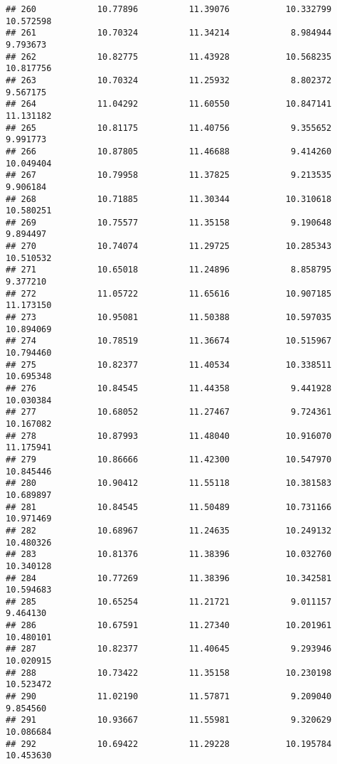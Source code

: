\documentclass[
]{article}
\begin{document}
\begin{verbatim}
## 260            10.77896          11.39076           10.332799         10.572598
## 261            10.70324          11.34214            8.984944          9.793673
## 262            10.82775          11.43928           10.568235         10.817756
## 263            10.70324          11.25932            8.802372          9.567175
## 264            11.04292          11.60550           10.847141         11.131182
## 265            10.81175          11.40756            9.355652          9.991773
## 266            10.87805          11.46688            9.414260         10.049404
## 267            10.79958          11.37825            9.213535          9.906184
## 268            10.71885          11.30344           10.310618         10.580251
## 269            10.75577          11.35158            9.190648          9.894497
## 270            10.74074          11.29725           10.285343         10.510532
## 271            10.65018          11.24896            8.858795          9.377210
## 272            11.05722          11.65616           10.907185         11.173150
## 273            10.95081          11.50388           10.597035         10.894069
## 274            10.78519          11.36674           10.515967         10.794460
## 275            10.82377          11.40534           10.338511         10.695348
## 276            10.84545          11.44358            9.441928         10.030384
## 277            10.68052          11.27467            9.724361         10.167082
## 278            10.87993          11.48040           10.916070         11.175941
## 279            10.86666          11.42300           10.547970         10.845446
## 280            10.90412          11.55118           10.381583         10.689897
## 281            10.84545          11.50489           10.731166         10.971469
## 282            10.68967          11.24635           10.249132         10.480326
## 283            10.81376          11.38396           10.032760         10.340128
## 284            10.77269          11.38396           10.342581         10.594683
## 285            10.65254          11.21721            9.011157          9.464130
## 286            10.67591          11.27340           10.201961         10.480101
## 287            10.82377          11.40645            9.293946         10.020915
## 288            10.73422          11.35158           10.230198         10.523472
## 290            11.02190          11.57871            9.209040          9.854560
## 291            10.93667          11.55981            9.320629         10.086684
## 292            10.69422          11.29228           10.195784         10.453630

\end{verbatim}
\end{document}
